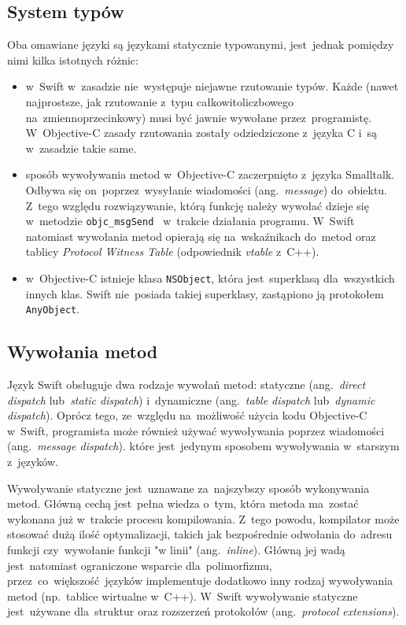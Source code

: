 \documentclass[mgr, shortabstract]{iithesis}
\newcommand{\ang}[1]{ang.~\textit{#1}}
\begin{document}
\subsection{System typów}
\label{s:system_typow}

Oba omawiane języki są językami statycznie typowanymi, jest~jednak pomiędzy nimi kilka istotnych różnic:

\begin{itemize}

    \item w~Swift w~zasadzie nie~występuje niejawne rzutowanie typów. Każde (nawet najprostsze, jak rzutowanie z~typu całkowitoliczbowego na~zmiennoprzecinkowy) musi być jawnie wywołane przez~programistę. W~Objective-C zasady rzutowania zostały odziedziczone z~języka C i~są w~zasadzie takie same.
    \item sposób wywoływania metod w~Objective-C zaczerpnięto z~języka Smalltalk. Odbywa się on~poprzez~wysyłanie wiadomości (\ang{message}) do~obiektu. Z~tego względu rozwiązywanie, którą funkcję należy wywołać dzieje się w~metodzie \texttt{objc_msgSend } w~trakcie działania programu. W~Swift natomiast wywołania metod opierają się na~wskaźnikach do~metod oraz tablicy \textit{Protocol Witness Table} (odpowiednik \textit{vtable} z~C++).
    \item w~Objective-C istnieje klasa \texttt{NSObject}, która jest~superklasą dla~wszystkich innych klas. Swift nie~posiada takiej superklasy, zastąpiono ją protokołem \texttt{AnyObject}.

\end{itemize}

\subsection{Wywołania metod}
\label{s:wywolania_metod}

Język Swift obsługuje dwa rodzaje wywołań metod: statyczne (\ang{direct dispatch} lub~\textit{static dispatch}) i~dynamiczne (\ang{table dispatch} lub~\textit{dynamic dispatch}). Oprócz tego, ze~względu na~możliwość użycia kodu Objective-C w~Swift, programista może również używać wywoływania poprzez wiadomości (\ang{message dispatch}). które jest~jedynym sposobem wywoływania w~starszym z~języków.

Wywoływanie statyczne jest~uznawane za~najszybszy sposób wykonywania metod. Główną cechą jest~pełna wiedza o~tym, która metoda ma~zostać wykonana już w~trakcie procesu kompilowania. Z~tego powodu, kompilator może stosować dużą ilość optymalizacji, takich jak bezpośrednie odwołania do~adresu funkcji czy~wywołanie funkcji "w linii" (\ang{inline}). Główną jej wadą jest~natomiast ograniczone wsparcie dla~polimorfizmu, przez~co~większość języków implementuje dodatkowo inny rodzaj wywoływania metod (np.~tablice wirtualne w~C++). W~Swift wywoływanie statyczne jest~używane dla~struktur oraz rozszerzeń protokołów (\ang{protocol extensions}).
\end{document}
